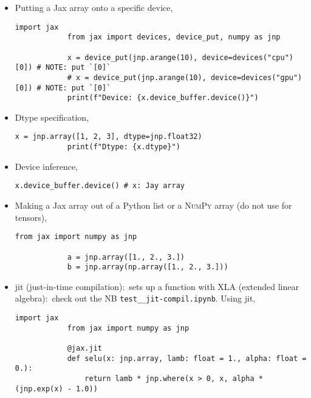 \documentclass[12pt, a4paper]{scrbook}
\numberwithin{equation}{section}
\theoremstyle{definition}
\theoremstyle{definition}
\begin{document}
	\begin{itemize}
		\item Putting a Jax array onto a specific device,
		
		\begin{lstlisting}[style=mystylepython, label=alg:jax_device, xleftmargin=\parindent]
			import jax
			from jax import devices, device_put, numpy as jnp
			
			x = device_put(jnp.arange(10), device=devices("cpu")[0]) # NOTE: put `[0]`
			# x = device_put(jnp.arange(10), device=devices("gpu")[0]) # NOTE: put `[0]`
			print(f"Device: {x.device_buffer.device()}")
		\end{lstlisting}
		
		\item Dtype specification,
		
		\begin{lstlisting}[style=mystylepython, label=alg:jax_dtype, xleftmargin=\parindent]
			x = jnp.array([1, 2, 3], dtype=jnp.float32)
			print(f"Dtype: {x.dtype}")
		\end{lstlisting}
	
		\item Device inference,
		
		\begin{lstlisting}[style=mystylepython, label=alg:jax__dev_retrieval, xleftmargin=\parindent]
			x.device_buffer.device() # x: Jay array
		\end{lstlisting}
	
		\item Making a Jax array out of a Python list or a \textsc{NumPy} array (do not use for \textsc{} tensors),
		
		\begin{lstlisting}[style=mystylepython, label=alg:jax_array_crea, xleftmargin=\parindent]
			from jax import numpy as jnp
			
			a = jnp.array([1., 2., 3.])
			b = jnp.array(np.array([1., 2., 3.]))
		\end{lstlisting}

		\item jit (just-in-time compilation):~sets up a function with XLA (extended linear algebra):~check out the NB \texttt{test\_\_jit-compil.ipynb}. Using jit,
		
		\begin{lstlisting}[style=mystylepython, label=alg:jax_jit, xleftmargin=\parindent]
			import jax
			from jax import numpy as jnp
			
			@jax.jit
			def selu(x: jnp.array, lamb: float = 1., alpha: float = 0.): 
				return lamb * jnp.where(x > 0, x, alpha * (jnp.exp(x) - 1.0))
		\end{lstlisting}
	\end{itemize}
\end{document}

